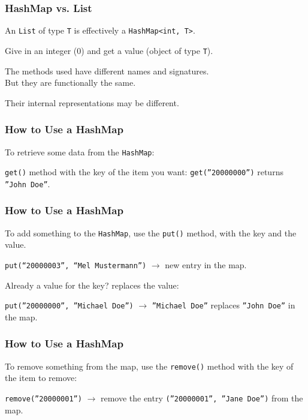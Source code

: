 \begin{frame}
\frametitle{HashMap vs. List}
\begin{changemargin}{1cm}

An \texttt{List} of type \texttt{T} is effectively a \texttt{HashMap<int, T>}. 

Give in an integer (0) and get a value (object of type \texttt{T}). 

The methods used have different names and signatures. \\
\quad But they are functionally the same. 

Their internal representations may be different.


\end{changemargin}
\end{frame}


\begin{frame}
\frametitle{How to Use a HashMap}
\begin{changemargin}{1cm}

To retrieve some data from the \texttt{HashMap}:

\texttt{get()} method with the key of the item you want: \texttt{get(''20000000'')} returns \texttt{''John Doe''}.


\end{changemargin}
\end{frame}


\begin{frame}
\frametitle{How to Use a HashMap}
\begin{changemargin}{1cm}


To add something to the \texttt{HashMap}, use the \texttt{put()} method, with the key and the value.

\texttt{put(``20000003'', ``Mel Mustermann'')} $\rightarrow$ new entry in the map. 

Already a value for the key? replaces the value: 

\texttt{put(''20000000'', ''Michael Doe'')} $\rightarrow$ \texttt{''Michael Doe''} replaces \texttt{''John Doe''} in the map.


\end{changemargin}
\end{frame}

\begin{frame}
\frametitle{How to Use a HashMap}
\begin{changemargin}{1cm}


To remove something from the map, use the \texttt{remove()} method with the key of the item to remove: 

\texttt{remove(''20000001'')} $\rightarrow$ remove the entry \texttt{(''20000001'', ''Jane Doe'')} from the map.

\end{changemargin}
\end{frame}


